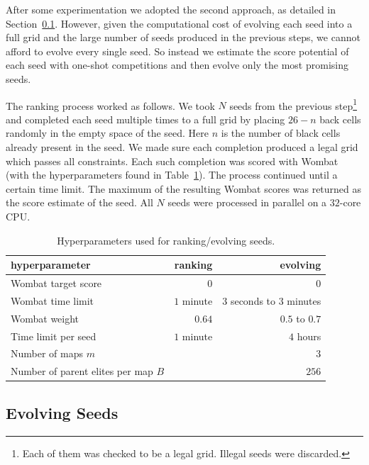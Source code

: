 After some experimentation we adopted the second approach, as detailed in Section~\ref{sec:evolution}. However, given the computational cost of evolving each seed into a full grid and the large number of seeds produced in the previous steps, we cannot afford to evolve every single seed. So instead we estimate the score potential of each seed with one-shot competitions and then evolve only the most promising seeds.

The ranking process worked as follows. We took $N$ seeds from the previous step\footnote{Each of them was checked to be a legal grid. Illegal seeds were discarded.} and completed each seed multiple times to a full grid by placing $26-n$ back cells randomly in the empty space of the seed. Here $n$ is the number of black cells already present in the seed. We made sure each completion produced a legal grid which passes all constraints. Each such completion was scored with {\sc Wombat} (with the hyperparameters found in Table~\ref{tab:hyperparameters}). The process continued until a certain time limit. The maximum of the resulting {\sc Wombat} scores was returned as the score estimate of the seed. All $N$ seeds were processed in parallel on a $32$-core CPU.

\begin{table}[htbp]
\caption{Hyperparameters used for ranking/evolving seeds.}
\label{tab:hyperparameters}
\centering
\begin{tabular}{l|r|r}
\toprule
{\bf hyperparameter} & {\bf ranking} & {\bf evolving} \\
\midrule
{\sc Wombat} target score & $0$ & $0$ \\
{\sc Wombat} time limit & $1$ minute & $3$ seconds to $3$ minutes \\
{\sc Wombat} weight & $0.64$ & $0.5$ to $0.7$ \\
Time limit per seed & $1$ minute & $4$ hours \\
Number of maps $m$ & & $3$ \\
Number of parent elites per map $B$ & & $256$ \\
\bottomrule
\end{tabular}
\end{table}


\subsection{Evolving Seeds}
\label{sec:evolution}

